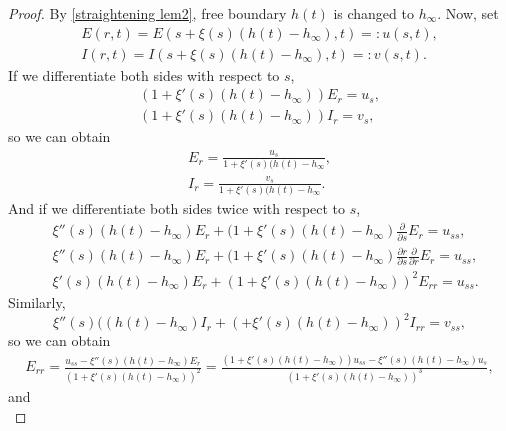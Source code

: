 \documentclass[11pt]{amsart}
\numberwithin{equation}{section}
\theoremstyle{plain}
\theoremstyle{definition}
\begin{document}
\begin{proof}
By \cref{straightening lem2}, free boundary $h(t)$ is changed to $h_\infty$. Now, set 
\begin{equation*}
	\begin{aligned}
	E(r,t) = E(s+\xi(s)(h(t)-h_\infty),t)=:u(s,t),\\
	I(r,t) = I(s+\xi(s)(h(t)-h_\infty),t)=:v(s,t).
	\end{aligned}
\end{equation*}
If we differentiate both sides with respect to $s$,
\begin{equation*}
	\begin{aligned}
		(1+\xi'(s)(h(t)-h_\infty))E_r=u_s,\\
		(1+\xi'(s)(h(t)-h_\infty))I_r=v_s,
	\end{aligned}
\end{equation*}
so we can obtain
\begin{equation*}
	\begin{aligned}
		E_r = \frac{u_s}{1+\xi'(s)(h(t)-h_\infty},\\
		I_r = \frac{v_s}{1+\xi'(s)(h(t)-h_\infty}.
	\end{aligned}
\end{equation*}
And if we differentiate both sides twice with respect to $s$,
\begin{equation*}
	\begin{aligned}
		&\xi''(s)(h(t)-h_\infty)E_r+(1+\xi'(s)(h(t)-h_\infty)\frac{\partial}{\partial s}E_r=u_{ss},\\
		&\xi''(s)(h(t)-h_\infty)E_r+(1+\xi'(s)(h(t)-h_\infty)\frac{\partial r}{\partial s}\frac{\partial}{\partial r}E_r=u_{ss},\\
		&\xi'(s)(h(t)-h_\infty)E_r+(1+\xi'(s)(h(t)-h_\infty))^2E_{rr}=u_{ss}.
	\end{aligned}
\end{equation*}
Similarly,
\begin{equation*}
	\xi''(s)((h(t)-h_\infty)I_r+(+\xi'(s)(h(t)-h_\infty))^2I_{rr}=v_{ss},
\end{equation*}
so we can obtain
\begin{equation*}
	\begin{aligned}
		E_{rr}=\frac{u_{ss}-\xi''(s)(h(t)-h_\infty)E_r}{(1+\xi'(s)(h(t)-h_\infty))^2}=\frac{(1+\xi'(s)(h(t)-h_\infty))u_{ss}-\xi''(s)(h(t)-h_\infty)u_s}{(1+\xi'(s)(h(t)-h_\infty))^3},
	\end{aligned}
\end{equation*}
and 
\begin{equation*}

\end{equation*}
\end{proof}
\end{document}
